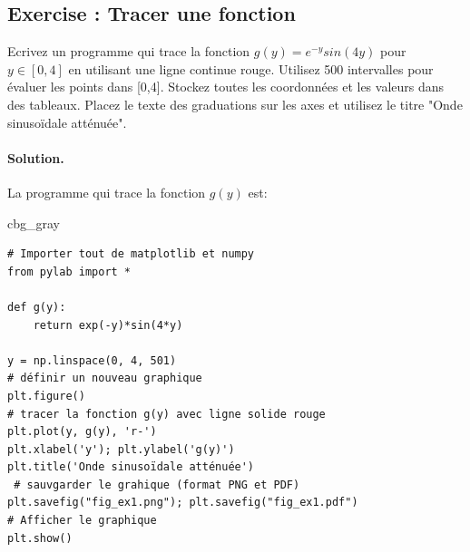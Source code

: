 \documentclass[%
oneside,                 %
final,                   %
10pt,french]{article}
\newenvironment{_cod_tight}[1]{
   \def\FrameCommand{\colorbox{#1}}
   \FrameRule0.6pt\MakeFramed {\FrameRestore}\vskip3mm}
   {\vskip0mm\endMakeFramed}
\newenvironment{cod}[1]{
\bgroup\rmfamily
\fboxsep=0mm\relax
\begin{_cod_tight}{#1}
\list{}{\parsep=-2mm\parskip=0mm\topsep=0pt\leftmargin=2mm
\rightmargin=2\leftmargin\leftmargin=4pt\relax}
\item\relax}
{\endlist\end{_cod_tight}\egroup}
\newenvironment{doconceexercise}{}{}
\newcounter{doconceexercisecounter}
\begin{document}

\newcommand{\exercisesection}[1]{\subsection*{#1}}



% 



\begin{doconceexercise}

\exercisesection{Exercise \thedoconceexercisecounter: Tracer une fonction}


Ecrivez un programme qui trace la fonction $g(y) = e^{-y} sin(4y)$ pour $y \in [0, 4]$ en utilisant une ligne continue rouge. Utilisez 500 intervalles pour évaluer les points dans [0,4]. Stockez toutes les coordonnées et les valeurs dans des tableaux. Placez le texte des graduations sur les axes et utilisez le titre "Onde sinusoïdale atténuée".


\paragraph{Solution.}
La programme qui trace la fonction $g(y)$ est:
\begin{cod}{cbg_gray}\begin{verbatim}
# Importer tout de matplotlib et numpy
from pylab import *

def g(y):
    return exp(-y)*sin(4*y)

y = np.linspace(0, 4, 501)
# définir un nouveau graphique
plt.figure()
# tracer la fonction g(y) avec ligne solide rouge
plt.plot(y, g(y), 'r-')
plt.xlabel('y'); plt.ylabel('g(y)')
plt.title('Onde sinusoïdale atténuée')
 # sauvgarder le grahique (format PNG et PDF)
plt.savefig("fig_ex1.png"); plt.savefig("fig_ex1.pdf")
# Afficher le graphique
plt.show()
\end{verbatim}
\end{cod}
\noindent


\end{doconceexercise}
\end{document}
